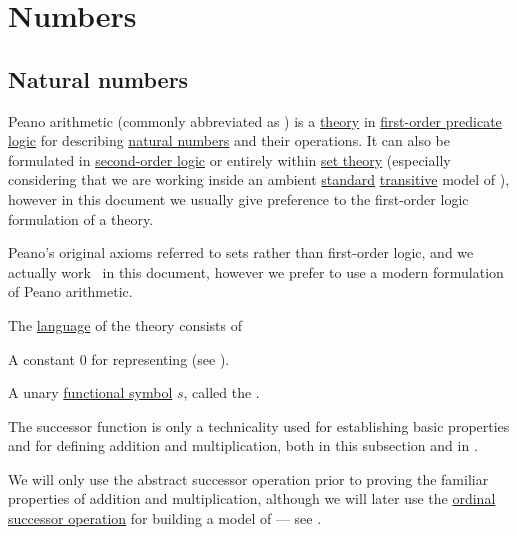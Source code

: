 \section{Numbers}\label{sec:numbers}
\subsection{Natural numbers}\label{subsec:natural_numbers}

\begin{definition}\label{def:peano_arithmetic}
  Peano arithmetic (commonly abbreviated as ) is a \hyperref[def:first_order_theory]{theory} in \hyperref[subsec:first_order_logic]{first-order predicate logic} for describing \hyperref[def:set_of_natural_numbers]{natural numbers} and their operations. It can also be formulated in \hyperref[rem:higher_order_logic]{second-order logic} or entirely within \hyperref[sec:set_theory]{set theory} (especially considering that we are working inside an ambient \hyperref[rem:standard_model_of_set_theory]{standard} \hyperref[rem:transitive_model_of_set_theory]{transitive} model of \hyperref[def:axiom_of_universes]{}), however in this document we usually give preference to the first-order logic formulation of a theory.

  Peano's original axioms referred to sets rather than first-order logic, and we actually work  \ in this document, however we prefer to use a modern formulation of Peano arithmetic.

  The \hyperref[def:first_order_language]{language} of the theory consists of
  \begin{thmenum}[series=def:peano_arithmetic]
     A constant \( 0 \) for representing  (see ).

     A unary \hyperref[def:first_order_language/func]{functional symbol} \( s \), called the .

    The successor function is only a technicality used for establishing basic properties and for defining addition and multiplication, both in this subsection and in .

    We will only use the abstract successor operation prior to proving the familiar properties of addition and multiplication, although we will later use the \hyperref[def:ordinal_successor]{ordinal successor operation} for building a model of  --- see .


\end{thmenum}
\end{definition}

